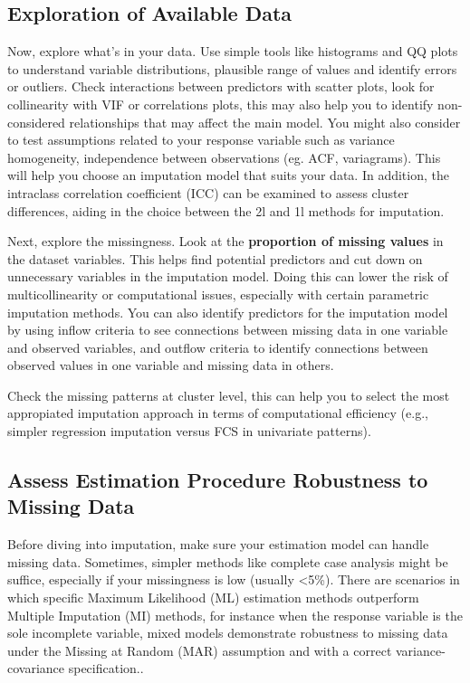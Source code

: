 \documentclass[
  article]{jss}
\begin{document}
\hypertarget{exploration-of-available-data}{%
\subsection{Exploration of Available
Data}\label{exploration-of-available-data}}

Now, explore what's in your data. Use simple tools like histograms and
QQ plots to understand variable distributions, plausible range of values
and identify errors or outliers. Check interactions between predictors
with scatter plots, look for collinearity with VIF or correlations
plots, this may also help you to identify non-considered relationships
that may affect the main model. You might also consider to test
assumptions related to your response variable such as variance
homogeneity, independence between observations (eg. ACF, variagrams).
This will help you choose an imputation model that suits your data. In
addition, the intraclass correlation coefficient (ICC) can be examined
to assess cluster differences, aiding in the choice between the 2l and
1l methods for imputation.

Next, explore the missingness. Look at the
\textbf{proportion of missing values} in the dataset variables. This
helps find potential predictors and cut down on unnecessary variables in
the imputation model. Doing this can lower the risk of multicollinearity
or computational issues, especially with certain parametric imputation
methods. You can also identify predictors for the imputation model by
using inflow criteria to see connections between missing data in one
variable and observed variables, and outflow criteria to identify
connections between observed values in one variable and missing data in
others.

Check the missing patterns at cluster level, this can help you to select
the most appropiated imputation approach in terms of computational
efficiency (e.g., simpler regression imputation versus FCS in univariate
patterns).

\hypertarget{assess-estimation-procedure-robustness-to-missing-data}{%
\subsection{Assess Estimation Procedure Robustness to Missing
Data}\label{assess-estimation-procedure-robustness-to-missing-data}}

Before diving into imputation, make sure your estimation model can
handle missing data. Sometimes, simpler methods like complete case
analysis might be suffice, especially if your missingness is low
(usually \textless5\%). There are scenarios in which specific Maximum
Likelihood (ML) estimation methods outperform Multiple Imputation (MI)
methods, for instance when the response variable is the sole incomplete
variable, mixed models demonstrate robustness to missing data under the
Missing at Random (MAR) assumption and with a correct
variance-covariance specification.\cite{Molenberghs_2007}.
\end{document}

